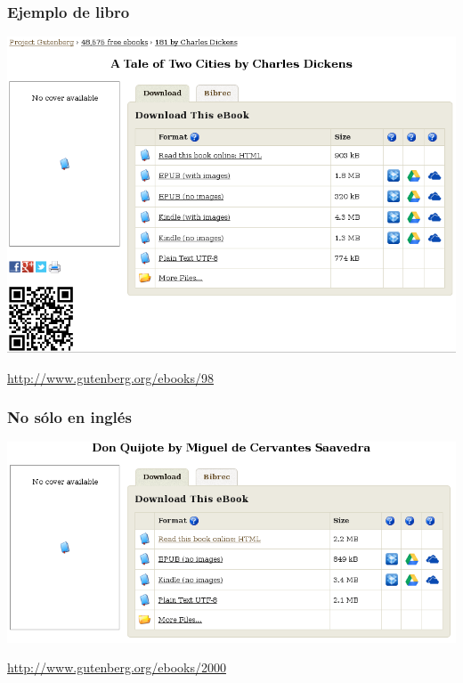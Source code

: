 \begin{frame}
\frametitle{Ejemplo de libro}

\includegraphics[width=10.cm]{figs/gutenberg-book}

\begin{flushright}
{\small
\url{http://www.gutenberg.org/ebooks/98}
}
\end{flushright}
\end{frame}

\begin{frame}
\frametitle{No sólo en inglés}

\includegraphics[width=12.cm]{figs/gutenberg-quijote}

\begin{flushright}
{\small
\url{http://www.gutenberg.org/ebooks/2000}
}
\end{flushright}
\end{frame}

